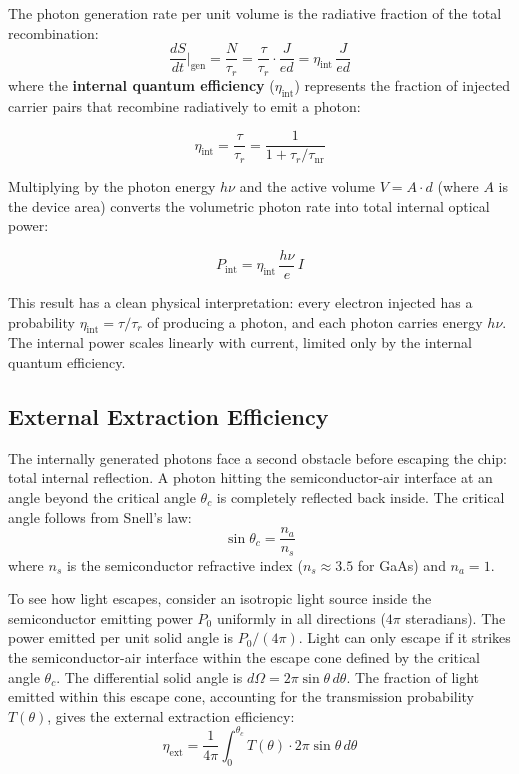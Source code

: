 The photon generation rate per unit volume is the radiative fraction of the total recombination:
\begin{equation*}
    \frac{dS}{dt}\bigg|_\text{gen} = \frac{N}{\tau_r} = \frac{\tau}{\tau_r}\cdot\frac{J}{ed} = \eta_\text{int}\,\frac{J}{ed}
\end{equation*}
where the \textbf{internal quantum efficiency} ($\eta_{\text{int}}$) represents the fraction of injected carrier pairs that recombine radiatively to emit a photon:
\begin{keyresult}
    \begin{equation}
        \eta_\text{int} = \frac{\tau}{\tau_r} = \frac{1}{1 + \tau_r/\tau_{\text{nr}}}
    \end{equation}
\end{keyresult}

Multiplying by the photon energy $h\nu$ and the active volume $V = A \cdot d$ (where $A$ is the device area) converts the volumetric photon rate into total internal optical power:
\begin{keyresult}
    \begin{equation}
        P_\text{int} = \eta_\text{int}\,\frac{h\nu}{e}\,I
    \end{equation}
\end{keyresult}

This result has a clean physical interpretation: every electron injected has a probability $\eta_\text{int} = \tau/\tau_r$ of producing a photon, and each photon carries energy $h\nu$. The internal power scales linearly with current, limited only by the internal quantum efficiency.

\subsection{External Extraction Efficiency}

The internally generated photons face a second obstacle before escaping the chip: total internal reflection. A photon hitting the semiconductor-air interface at an angle beyond the critical angle $\theta_c$ is completely reflected back inside. The critical angle follows from Snell's law:
\begin{equation*}
    \sin\theta_c = \frac{n_a}{n_s}
\end{equation*}
where $n_s$ is the semiconductor refractive index ($n_s \approx 3.5$ for GaAs) and $n_a = 1$.

To see how light escapes, consider an isotropic light source inside the semiconductor emitting power $P_0$ uniformly in all directions ($4\pi$ steradians). The power emitted per unit solid angle is $P_0/(4\pi)$. Light can only escape if it strikes the semiconductor-air interface within the escape cone defined by the critical angle $\theta_c$. The differential solid angle is $d\Omega = 2\pi\sin\theta\,d\theta$. The fraction of light emitted within this escape cone, accounting for the transmission probability $T(\theta)$, gives the external extraction efficiency:
\begin{equation*}
    \eta_\text{ext} = \frac{1}{4\pi}\int_0^{\theta_c} T(\theta)\cdot 2\pi\sin\theta\,d\theta
\end{equation*}


